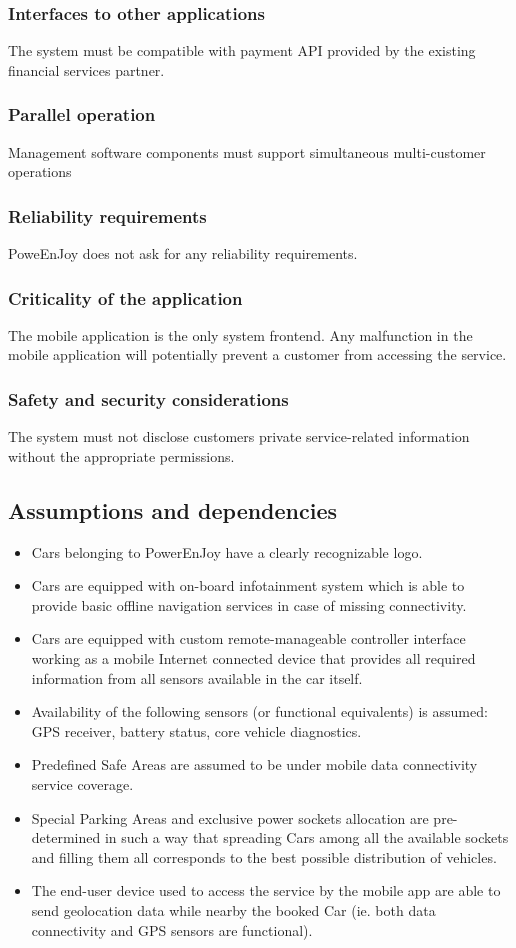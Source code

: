 \subsubsection{Interfaces to other applications}
The system must be compatible with payment API provided by the existing financial services partner.
\subsubsection{Parallel operation}
Management software components must support simultaneous multi-customer operations 
\subsubsection{Reliability requirements}
PoweEnJoy does not ask for any reliability requirements.
\subsubsection{Criticality of the application}
The mobile application is the only system frontend. Any malfunction in the mobile application will potentially prevent a customer from accessing the service.
\subsubsection{Safety and security considerations}
The system must not disclose customers private service-related information without the appropriate permissions.
\subsection{Assumptions and dependencies}
\begin{itemize}
\item Cars belonging to PowerEnJoy have a clearly recognizable logo.
\item Cars are equipped with on-board infotainment system which is able to provide basic offline navigation services in case of missing connectivity.
\item Cars are equipped with custom remote-manageable controller interface working as a mobile Internet connected device that provides all required information from all sensors available in the car itself.
\item Availability of the following sensors (or functional equivalents) is assumed: GPS receiver, battery status, core vehicle diagnostics.
\item Predefined Safe Areas are assumed to be under mobile data connectivity service coverage.
\item Special Parking Areas and exclusive power sockets allocation are pre-determined in such a way that spreading Cars among all the available sockets and filling them all corresponds to the best possible distribution of vehicles.
\item The end-user device used to access the service by the mobile app are able to send geolocation data while nearby the booked Car (ie. both data connectivity and GPS sensors are functional).
\end{itemize}
